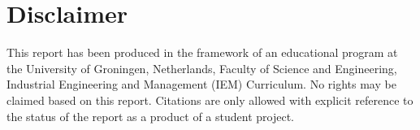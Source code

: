 \section*{Disclaimer}
This report has been produced in the framework of an educational program at the University of
Groningen, Netherlands, Faculty of Science and Engineering, Industrial Engineering and Management
(IEM) Curriculum. No rights may be claimed based on this report. Citations are only allowed with
explicit reference to the status of the report as a product of a student project.